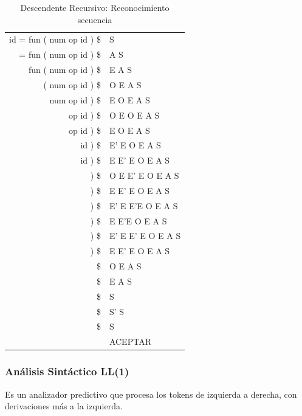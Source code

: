 \documentclass[12pt, twoside, openright]{report} %
\begin{document}
\begin{table}[H]
	\centering
	\begin{tabular}{r|l}
		id = fun ( num op id ) \$ & S                 \\
		= fun ( num op id ) \$    & A S               \\
		fun ( num op id ) \$      & E A S             \\
		( num op id ) \$          & O E A S           \\
		num op id ) \$            & E O E A S         \\
		op id ) \$                & O E O E A S       \\
		op id ) \$                & E O E A S         \\
		id ) \$                   & E' E O E A S      \\
		id ) \$                   & E E' E O E A S    \\
		) \$                      & O E E' E O E A S  \\
		) \$                      & E E' E O E A S    \\
		) \$                      & E' E E'E O E A S  \\
		) \$                      & E E'E O E A S     \\
		) \$                      & E' E E' E O E A S \\
		) \$                      & E E' E O E A S    \\
		\$                        & O E A S           \\
		\$                        & E A S             \\
		\$                        & S                 \\
		\$                        & S' S              \\
		\$                        & S                 \\
		                          & ACEPTAR
	\end{tabular}
	\caption{Descendente Recursivo: Reconocimiento secuencia}
\end{table}

\pagebreak

\subsubsection{Análisis Sintáctico LL(1)}

Es un analizador predictivo que procesa los tokens de izquierda a
derecha, con derivaciones más a la izquierda.
\end{document}
